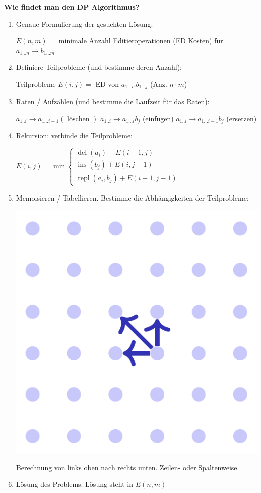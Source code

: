 \begin{sectionbox}
\textbf{Wie findet man den DP Algorithmus?}\par
\begin{enumerate}
    \item Genaue Formulierung der gesuchten Lösung:
    \par $E(n, m)=$ minimale Anzahl Editieroperationen (ED Kosten) für $a_{1 \ldots n} \rightarrow b_{1 \ldots m}$
    \item Definiere Teilprobleme (und bestimme deren Anzahl):
    \par Teilprobleme $E(i, j)=$ ED von $a_{1 \dots i} . b_{1 \dots j}$ (Anz. $n \cdot m$)
    \item Raten / Aufzählen (und bestimme die Laufzeit für das Raten):
    \par $a_{1 . . i} \rightarrow a_{1 \ldots i-1}(\text { löschen })$
    $a_{1 . . i} \rightarrow a_{1 \ldots i} b_{j}$ (einfügen)
    $a_{1 . . i} \rightarrow a_{1 \ldots i-1} b_{j}$ (ersetzen)
    \item Rekursion: verbinde die Teilprobleme:
    \par \begin{center}
        $E(i, j)=\min \left\{\begin{array}{l}\operatorname{del}\left(a_{i}\right)+E(i-1, j) \\ \operatorname{ins}\left(b_{j}\right)+E(i, j-1) \\ \operatorname{repl}\left(a_{i}, b_{j}\right)+E(i-1, j-1)\end{array}\right.$
    \end{center}
    \item Memoisieren / Tabellieren. Bestimme die Abhängigkeiten der Teilprobleme:
    \par \begin{center}
        \includegraphics[width=0.4\columnwidth]{../img/Lst_Abh.png}
    \end{center}
    \par Berechnung von links oben nach rechts unten. Zeilen- oder Spaltenweise.
    \item Lösung des Problems: Lösung steht in $E(n, m)$
\end{enumerate}\vspace{7px}


\end{sectionbox}
